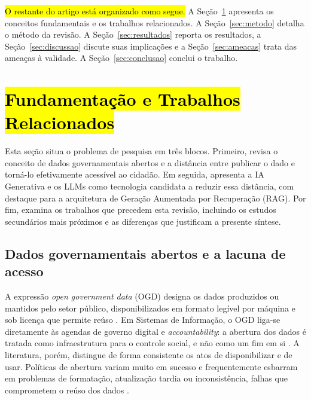 \documentclass[brazilian]{sbc2025}
\newif\ifhl \hltrue
\newcommand{\rev}[1]{\ifhl\sethlcolor{yellow}\hl{#1}\else#1\fi}
\begin{document}
\rev{O restante do artigo está organizado como segue.} A Seção~\ref{sec:background} apresenta os conceitos fundamentais e os trabalhos relacionados. A Seção~\ref{sec:metodo} detalha o método da revisão. A Seção~\ref{sec:resultados} reporta os resultados, a Seção~\ref{sec:discussao} discute suas implicações e a Seção~\ref{sec:ameacas} trata das ameaças à validade. A Seção~\ref{sec:conclusao} conclui o trabalho.

\section{\texorpdfstring{\rev{Fundamentação e Trabalhos Relacionados}}{Fundamentacao e Trabalhos Relacionados}}
\label{sec:background}

Esta seção situa o problema de pesquisa em três blocos. Primeiro, revisa o conceito de dados governamentais abertos e a distância entre publicar o dado e torná-lo efetivamente acessível ao cidadão. Em seguida, apresenta a IA Generativa e os LLMs como tecnologia candidata a reduzir essa distância, com destaque para a arquitetura de Geração Aumentada por Recuperação (RAG). Por fim, examina os trabalhos que precedem esta revisão, incluindo os estudos secundários mais próximos e as diferenças que justificam a presente síntese.

\subsection{Dados governamentais abertos e a lacuna de acesso}
\label{subsec:bg_ogd}

A expressão \emph{open government data} (OGD) designa os dados produzidos ou mantidos pelo setor público, disponibilizados em formato legível por máquina e sob licença que permite reúso \citep{ZuiderwijkJanssen2014}. Em Sistemas de Informação, o OGD liga-se diretamente às agendas de governo digital e \emph{accountability}: a abertura dos dados é tratada como infraestrutura para o controle social, e não como um fim em si \citep{RibeiroAlmeida2011,OliveiraCkagnazaroff2022}. A literatura, porém, distingue de forma consistente os atos de disponibilizar e de usar. Políticas de abertura variam muito em sucesso e frequentemente esbarram em problemas de formatação, atualização tardia ou inconsistência, falhas que comprometem o reúso dos dados \citep{ZuiderwijkJanssen2014,Vetro2016}.
\end{document}
